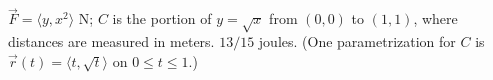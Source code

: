 {$\vec F = \langle y,x^2\rangle$ N; $C$ is the portion of $y=\sqrt x$ from $(0,0)$ to $(1,1)$, where distances are measured in meters.
}
{$13/15$ joules. (One parametrization for $C$ is $\vec r(t) = \langle t,\sqrt t\rangle$ on $0\leq t\leq 1$.)
}
